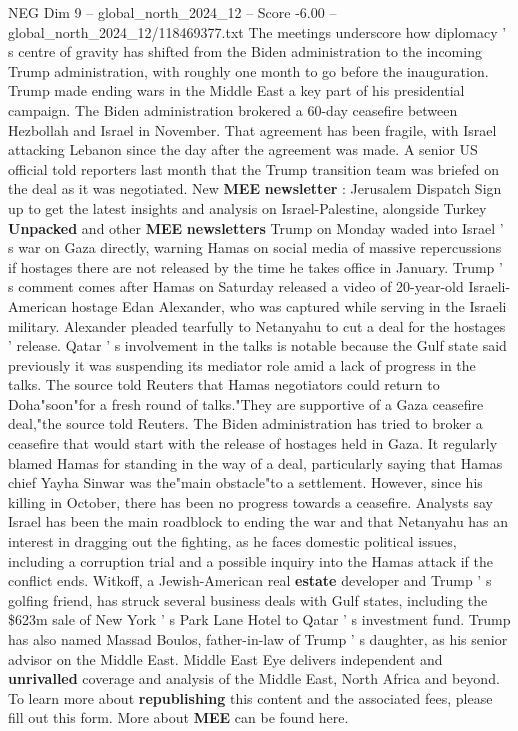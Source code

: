 \begin{textsample}{NEG Dim 9 – global\_north\_2024\_12 – Score -6.00 – global\_north\_2024\_12/118469377.txt}  \label{ex:f9_neg_121}
The meetings underscore how diplomacy ' s centre of gravity has shifted from the Biden administration to the incoming Trump administration, with roughly one month to go before the inauguration.
Trump made ending wars in the Middle East a key part of his presidential campaign.
The Biden administration brokered a 60-day ceasefire between Hezbollah and Israel in November.
That agreement has been fragile, with Israel attacking Lebanon since the day after the agreement was made.
A senior US official told reporters last month that the Trump transition team was briefed on the deal as it was negotiated.
New \textbf{MEE} \textbf{newsletter} : Jerusalem Dispatch Sign up to get the latest insights and analysis on Israel-Palestine, alongside Turkey \textbf{Unpacked} and other \textbf{MEE} \textbf{newsletters} Trump on Monday waded into Israel ' s war on Gaza directly, warning Hamas on social media of massive repercussions if hostages there are not released by the time he takes office in January.
Trump ' s comment comes after Hamas on Saturday released a video of 20-year-old Israeli-American hostage Edan Alexander, who was captured while serving in the Israeli military.
Alexander pleaded tearfully to Netanyahu to cut a deal for the hostages ' release.
Qatar ' s involvement in the talks is notable because the Gulf state said previously it was suspending its mediator role amid a lack of progress in the talks.
The source told Reuters that Hamas negotiators could return to Doha"soon"for a fresh round of talks."They are supportive of a Gaza ceasefire deal,"the source told Reuters.
The Biden administration has tried to broker a ceasefire that would start with the release of hostages held in Gaza.
It regularly blamed Hamas for standing in the way of a deal, particularly saying that Hamas chief Yayha Sinwar was the"main obstacle"to a settlement.
However, since his killing in October, there has been no progress towards a ceasefire.
Analysts say Israel has been the main roadblock to ending the war and that Netanyahu has an interest in dragging out the fighting, as he faces domestic political issues, including a corruption trial and a possible inquiry into the Hamas attack if the conflict ends.
Witkoff, a Jewish-American real \textbf{estate} developer and Trump ' s golfing friend, has struck several business deals with Gulf states, including the \$623m sale of New York ' s Park Lane Hotel to Qatar ' s investment fund.
Trump has also named Massad Boulos, father-in-law of Trump ' s daughter, as his senior advisor on the Middle East.
Middle East Eye delivers independent and \textbf{unrivalled} coverage and analysis of the Middle East, North Africa and beyond.
To learn more about \textbf{republishing} this content and the associated fees, please fill out this form.
More about \textbf{MEE} can be found here.

\end{textsample}
